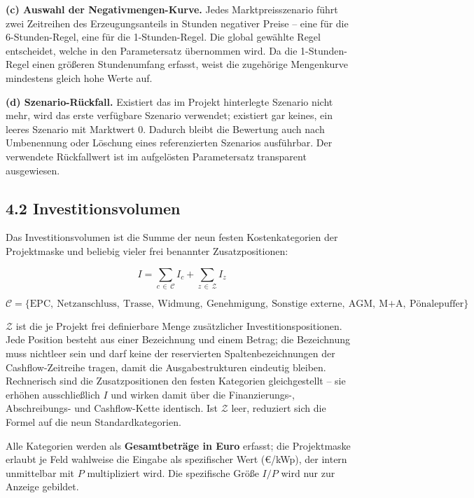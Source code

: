 \documentclass[
  a4paper,
  10pt]{article}
\begin{document}
\textbf{(c) Auswahl der Negativmengen-Kurve.} Jedes Marktpreisszenario
führt zwei Zeitreihen des Erzeugungsanteils in Stunden negativer Preise
-- eine für die 6-Stunden-Regel, eine für die 1-Stunden-Regel. Die
global gewählte Regel entscheidet, welche in den Parametersatz
übernommen wird. Da die 1-Stunden-Regel einen größeren Stundenumfang
erfasst, weist die zugehörige Mengenkurve mindestens gleich hohe Werte
auf.

\textbf{(d) Szenario-Rückfall.} Existiert das im Projekt hinterlegte
Szenario nicht mehr, wird das erste verfügbare Szenario verwendet;
existiert gar keines, ein leeres Szenario mit Marktwert 0. Dadurch
bleibt die Bewertung auch nach Umbenennung oder Löschung eines
referenzierten Szenarios ausführbar. Der verwendete Rückfallwert ist im
aufgelösten Parametersatz transparent ausgewiesen.

\hypertarget{investitionsvolumen}{%
\subsection{4.2 Investitionsvolumen}\label{investitionsvolumen}}

Das Investitionsvolumen ist die Summe der neun festen Kostenkategorien
der Projektmaske und beliebig vieler frei benannter Zusatzpositionen:

\[ I = \sum_{c\, \in\, \mathcal{C}} I_c + \sum_{z\, \in\, \mathcal{Z}} I_z \]

\[ \mathcal{C} = \{\text{EPC},\ \text{Netzanschluss},\ \text{Trasse},\ \text{Widmung},\ \text{Genehmigung},\ \text{Sonstige externe},\ \text{AGM},\ \text{M+A},\ \text{Pönalepuffer}\} \]

\(\mathcal{Z}\) ist die je Projekt frei definierbare Menge zusätzlicher
Investitionspositionen. Jede Position besteht aus einer Bezeichnung und
einem Betrag; die Bezeichnung muss nichtleer sein und darf keine der
reservierten Spaltenbezeichnungen der Cashflow-Zeitreihe tragen, damit
die Ausgabestrukturen eindeutig bleiben. Rechnerisch sind die
Zusatzpositionen den festen Kategorien gleichgestellt -- sie erhöhen
ausschließlich \(I\) und wirken damit über die Finanzierungs-,
Abschreibungs- und Cashflow-Kette identisch. Ist \(\mathcal{Z}\) leer,
reduziert sich die Formel auf die neun Standardkategorien.

Alle Kategorien werden als \textbf{Gesamtbeträge in Euro} erfasst; die
Projektmaske erlaubt je Feld wahlweise die Eingabe als spezifischer Wert
(€/kWp), der intern unmittelbar mit \(P\) multipliziert wird. Die
spezifische Größe \(I/P\) wird nur zur Anzeige gebildet.
\end{document}
